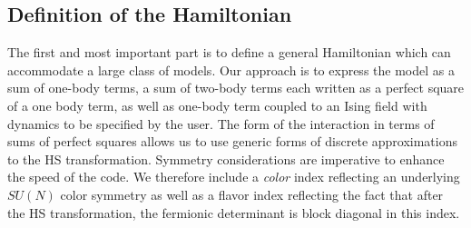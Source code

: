 \subsection{Definition of the Hamiltonian}

The first and most important  part is to define a general Hamiltonian which  can  accommodate a large class of models. 
Our approach is to express the model as a sum of one-body terms, a sum of two-body terms each written as a perfect square of a one body term, as well as one-body  term  coupled to an Ising field with  dynamics to be specified by the user. 
The form of the interaction in terms of sums of perfect squares allows us to use generic forms of  discrete  approximations to the  HS  transformation. 
Symmetry considerations  are  imperative to enhance the speed of the code.  
We therefore include a \textit{color} index  reflecting  an underlying  $SU(N)$ color symmetry as  well as a flavor index  reflecting  the fact that  after  the HS  transformation,  the  fermionic determinant is block diagonal in this index.

